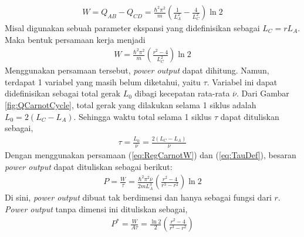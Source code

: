 \begin{align}
    W = Q_{AB} - Q_{CD} = \frac{\hbar^2\pi^2}{m}\left(\frac{1}{L_A^2} - \frac{4}{L_C^2}\right) \ln{2}
\end{align}
Misal digunakan sebuah parameter ekspansi yang didefinisikan sebagai \(L_C = rL_A\). Maka bentuk persamaan kerja menjadi
\begin{align}
    W = \frac{\hbar^2\pi^2}{m}\left(\frac{r^2-4}{L_C^2}\right)\ln{2} \label{eq:RegCarnotW}
\end{align}
Menggunakan persamaan tersebut, \textit{power output} dapat dihitung. Namun, terdapat 1 variabel yang masih belum diketahui, yaitu \(\tau\). Variabel ini dapat didefinisikan sebagai total gerak \(L_0\) dibagi kecepatan rata-rata \(\overline{\nu}\). Dari Gambar \ref{fig:QCarnotCycle}, total gerak yang dilakukan selama 1 siklus adalah \(L_0 = 2(L_C - L_A)\). Sehingga waktu total selama 1 siklus \(\tau\) dapat dituliskan sebagai,
\begin{align}
    \tau = \frac{L_0}{\overline{\nu}} = \frac{2(L_C - L_A)}{\overline{\nu}} \label{eq:TauDef}
\end{align}
Dengan menggunakan persamaan (\ref{eq:RegCarnotW}) dan (\ref{eq:TauDef}), besaran \textit{power output} dapat dituliskan sebagai berikut:
\begin{align}
    P = \frac{W}{\tau} = \frac{\hbar^2\pi^2\overline{\nu}}{2mL_A^3}\left(\frac{r^2 - 4}{r^3 - r^2}\right)\ln{2}
\end{align}
Di sini, \textit{power output} dibuat tak berdimensi dan hanya sebagai fungsi dari \(r\). \textit{Power output} tanpa dimensi ini dituliskan sebagai,
\begin{align}
    P^* = \frac{W}{A\tau} = \frac{\ln{2}}{2}\left(\frac{r^2 - 4}{r^3 - r^2}\right)
\end{align}
